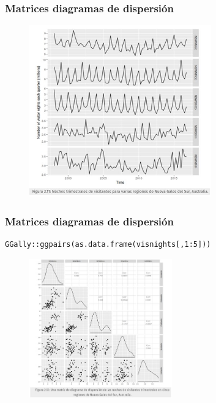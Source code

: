 \documentclass[10pt]{beamer}
\begin{document}






\begin{frame}[fragile]
\frametitle{Matrices diagramas de dispersión}


\begin{figure}
\begin{center}
    \includegraphics[width=0.7\textwidth]{Imagen24.JPG}
\end{center}
\end{figure}

\end{frame}








\begin{frame}[fragile]
\frametitle{Matrices diagramas de dispersión}


\lstset{language=r,label= ,caption= ,captionpos=b,numbers=none}
\begin{lstlisting}
GGally::ggpairs(as.data.frame(visnights[,1:5]))
  \end{lstlisting}

\pause

\begin{figure}
\begin{center}
    \includegraphics[width=0.55\textwidth]{Imagen25.JPG}
\end{center}
\end{figure}

\end{frame}
\end{document}
